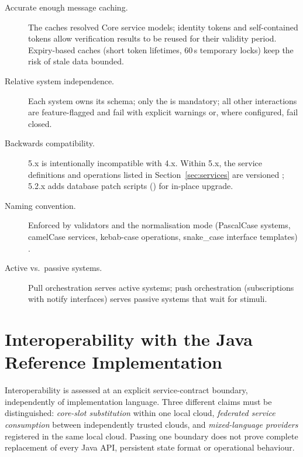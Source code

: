 \documentclass[a4paper]{arrowhead}
\newcommand{\sys}[1]{\textcolor{ArrowheadBlue}{\textbf{\ahbreak{#1}}}}      %
\begin{document}
\begin{description}
  \item[Accurate enough message caching.] The  caches resolved Core
        service models; identity tokens and self-contained tokens allow verification
        results to be reused for their validity period. Expiry-based caches (short token
        lifetimes, 60\,s temporary locks) keep the risk of stale data bounded.
  \item[Relative system independence.] Each system owns its schema; only the
        \sys{ServiceRegistry} is mandatory; all other interactions are feature-flagged and
        fail with explicit warnings or, where configured, fail closed.
  \item[Backwards compatibility.] 5.x is intentionally incompatible with 4.x. Within 5.x, the
        service definitions and operations listed in Section~\ref{sec:services} are versioned
        ; 5.2.x adds database patch scripts () for
        in-place upgrade.
  \item[Naming convention.] Enforced by validators and the  normalisation mode
        (PascalCase systems, camelCase services, kebab-case operations, snake\_case
        interface templates) \cite{naming2}.
  \item[Active vs.\ passive systems.] Pull orchestration serves active systems; push
        orchestration (subscriptions with notify interfaces) serves passive systems that
        wait for stimuli.
\end{description}



\newpage

\FloatBarrier
\section{Interoperability with the Java Reference Implementation}
\label{sec:interop}
Interoperability is assessed at an explicit service-contract boundary, independently
of implementation language. Three different claims must be distinguished:
\emph{core-slot substitution} within one local cloud, \emph{federated service
consumption} between independently trusted clouds, and \emph{mixed-language
providers} registered in the same local cloud. Passing one boundary does not prove
complete replacement of every Java API, persistent state format or operational behaviour.
\end{document}
